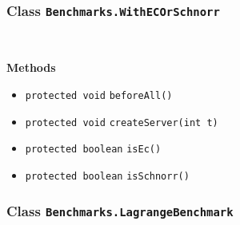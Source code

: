 \subsubsection{Class \lstinline|Benchmarks.WithECOrSchnorr|}
 \\
\noindent\begin{minipage}[t]{5cm}
\vspace{0.3em}
\hspace*{2em}
\vspace{0.3em}
\end{minipage}





\textbf{\sffamily Methods}
\begin{itemize}
\item \lstinline|protected void| \lstinline|beforeAll|\lstinline|()| \\[-0.6em]




\item \lstinline|protected void| \lstinline|createServer|\lstinline|(int t)| \\[-0.6em]




\item \lstinline|protected boolean| \lstinline|isEc|\lstinline|()| \\[-0.6em]




\item \lstinline|protected boolean| \lstinline|isSchnorr|\lstinline|()| \\[-0.6em]




\end{itemize}

\subsubsection{Class \lstinline|Benchmarks.LagrangeBenchmark|}
 \\
\noindent\begin{minipage}[t]{5cm}
\vspace{0.3em}
\hspace*{2em}
\vspace{0.3em}
\end{minipage}



